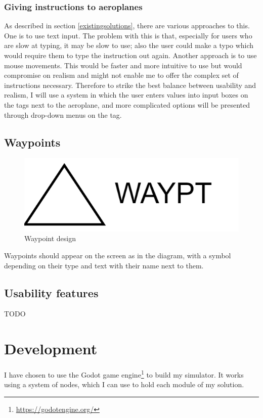 \documentclass{article}
\begin{document}
\subsubsection{Giving instructions to aeroplanes}
As described in section \ref{existingsolutions}, there are various approaches to this.
One is to use text input.
The problem with this is that, especially for users who are slow at typing, it may be slow to use; also the user could make a typo which would require them to type the instruction out again.
Another approach is to use mouse movements.
This would be faster and more intuitive to use but would compromise on realism and might not enable me to offer the complex set of instructions necessary.
Therefore to strike the best balance between usability and realism, I will use a system in which the user enters values into input boxes on the tags next to the aeroplane, and more complicated options will be presented through drop-down menus on the tag.


\subsection{Waypoints}
\begin{figure}[H]
\centering
\includegraphics{diagrams/waypointdesign.png}
\caption{\label{fig:waypointdesign}Waypoint design}
\end{figure}
Waypoints should appear on the screen as in the diagram, with a symbol depending on their type and text with their name next to them.


\subsection{Usability features}
TODO


\clearpage
\section{Development}
I have chosen to use the Godot game engine\footnote{\url{https://godotengine.org/}} to build my simulator.
It works using a system of nodes, which I can use to hold each module of my solution.
\end{document}
